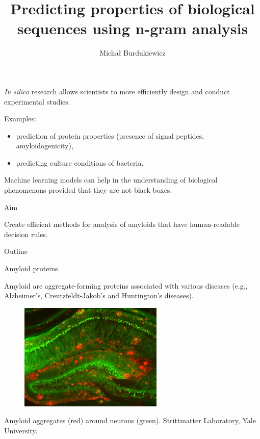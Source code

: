 \documentclass{beamer}\usepackage[]{graphicx}\usepackage[]{color}
\title{Predicting properties of biological sequences using n-gram analysis}
\date{}
\author{Michał Burdukiewicz}
\institute{Department of Genomics, University of Wrocław}
\begin{document}
  

\maketitle

\begin{frame}{} 

\textit{In silico} research allows scientists to more efficiently design and conduct experimental studies.

Examples: 

\begin{itemize}
\item prediction of protein properties (presence of signal peptides, amyloidogenicity),  
\item predicting culture conditions of bacteria.
\end{itemize}

\end{frame}   
  
\begin{frame}{} 

Machine learning models can help in the understanding of biological phenomenons provided that they are not black boxes.

\end{frame}    
  
\begin{frame}{Aim} 

Create efficient methods for analysis of amyloids that have human-readable decision rules.

\end{frame}   

\begin{frame}{Outline}

\tableofcontents

\end{frame} 


\begin{frame}{Amyloid proteins}

Amyloid are aggregate-forming proteins associated with various diseases (e.g., Alzheimer’s,
Creutzfeldt-Jakob’s and Huntington’s diseases).

\begin{figure} 
\includegraphics[width=0.61\textwidth]{static_figure/amyloid_aggregates.jpg}
\end{figure}

\footnotesize
Amyloid aggregates (red) around neurons (green). Strittmatter Laboratory, Yale University.

\end{frame}  
\end{document}
